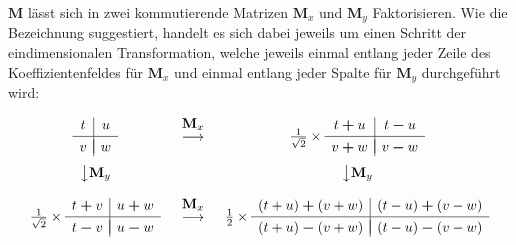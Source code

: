 %
$\mathbf{M}$ lässt sich in zwei kommutierende Matrizen $\mathbf{M}_x$ und $\mathbf{M}_y$ Faktorisieren. Wie die Bezeichnung suggestiert, handelt es sich dabei jeweils um einen Schritt der eindimensionalen Transformation, welche jeweils einmal entlang jeder Zeile des Koeffizientenfeldes für $\mathbf{M}_x$ und einmal entlang jeder Spalte für $\mathbf{M}_y$ durchgeführt wird:
%
\[
\begin{array}{ccc}
\begin{array}{c|c}
t & u \\[.05cm] 
\hline \\[-0.35cm]
v & w
\end{array}
&
\begin{array}{c}
 \\[-0.3cm] \mathbf{M}_x \\[-0.1cm] \longrightarrow \\ \\
\end{array}
&
\frac{1}{\sqrt{2}} \times
\begin{array}{c|c}
t\boldsymbol{+}u & t\boldsymbol{-}u \\[.05cm] 
\hline \\[-0.35cm]
v\boldsymbol{+}w & v\boldsymbol{-}w
\end{array}
\\[.5cm]
\big\downarrow \mathbf{M}_y & & \big\downarrow \mathbf{M}_y \\[.25cm]
\frac{1}{\sqrt{2}} \times
\begin{array}{c|c}
t\boldsymbol{+}v & u\boldsymbol{+}w \\[.05cm] 
\hline \\[-0.35cm]
t\boldsymbol{-}v & u\boldsymbol{-}w
\end{array}
&
\begin{array}{c}
 \\[-0.3cm] \mathbf{M}_x \\[-0.1cm] \longrightarrow \\ \\
\end{array}
&
\frac{1}{2} \times
\begin{array}{c|c}
(t+u)\boldsymbol{+}(v+w) & (t-u)\boldsymbol{+}(v-w) \\[.05cm] 
\hline \\[-0.35cm]
(t+u)\boldsymbol{-}(v+w) & (t-u)\boldsymbol{-}(v-w)
\end{array}
\\
\end{array}
\]
